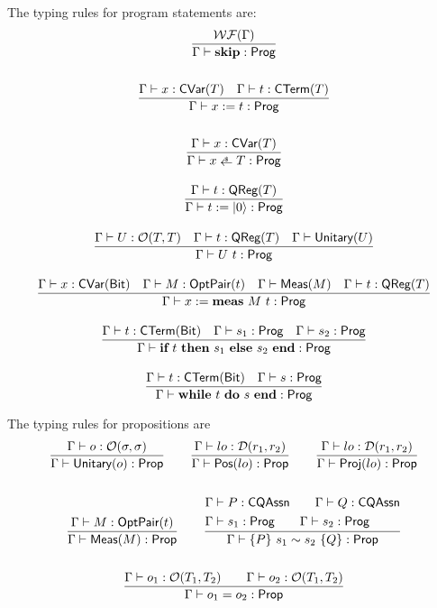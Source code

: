 The typing rules for program statements are:
\begin{gather*}
    \frac{\WF{\Gamma}}{\Gamma \vdash \Skip : \prog} \\
    \\
    \frac{\Gamma \vdash x : \cvar{T} \quad \Gamma \vdash t : \CTerm{T}}{\Gamma \vdash \Assign{x}{t} : \prog} \\
    \\
    \frac{\Gamma \vdash x : \cvar{T}}{\Gamma \vdash \pAssign{x}{T} : \prog} \\
    \\
    \frac{\Gamma \vdash t : \qreg{T}}{\Gamma \vdash \Init{t} : \prog} \\
    \\
    \frac{\Gamma \vdash U : \opt{T}{T} \quad \Gamma \vdash t : \qreg{T} \quad \Gamma \vdash \unitary{U}}{\Gamma \vdash U\ t : \prog} \\
    \\
    \frac{\Gamma \vdash x : \cvar{\bit} \quad \Gamma \vdash M : \optpair{t} \quad \Gamma \vdash \meas{M} \quad \Gamma \vdash t : \qreg{T} }{\Gamma \vdash \MeaAssign{x}{M}{t} : \prog} \\
    \\
    \frac{\Gamma \vdash t : \CTerm{\bit} \quad \Gamma \vdash s_1 : \prog \quad \Gamma \vdash s_2 : \prog}
    {\Gamma \vdash \If{t}{s_1}{s_2} : \prog} \\
    \\
    \frac{\Gamma \vdash t : \CTerm{\bit} \quad \Gamma \vdash s : \prog}
    {\Gamma \vdash \While{t}{s} : \prog}
\end{gather*}



The typing rules for propositions are
\begin{gather*}
    \frac{\Gamma \vdash o : \mathcal{O}(\sigma, \sigma)}{\Gamma \vdash \textsf{Unitary}({o}) : \textsf{Prop}}
    \qquad
    \frac{\Gamma \vdash lo : \mathcal{D}(r_1, r_2)}{\Gamma \vdash \textsf{Pos}({lo}) : \textsf{Prop}} 
    \qquad
    \frac{\Gamma \vdash lo : \mathcal{D}(r_1, r_2)}{\Gamma \vdash \textsf{Proj}({lo}) : \textsf{Prop}} \\
    \\
    \frac{\Gamma \vdash M : \textsf{OptPair}(t)}{\Gamma \vdash \textsf{Meas}(M) : \textsf{Prop}}
    \qquad
    \frac{
        \begin{aligned}
            & \Gamma \vdash P : \textsf{CQAssn} \qquad \Gamma \vdash Q : \textsf{CQAssn} \\
            & \Gamma \vdash s_1 : \textsf{Prog} \qquad \Gamma \vdash s_2 : \textsf{Prog}
        \end{aligned}}
        {
            \Gamma \vdash \{P\}~s_1 \sim s_2~\{Q\} : \textsf{Prop}
        } \\
    \\
    \frac{\Gamma \vdash o_1 : \mathcal{O}(T_1, T_2) \qquad \Gamma \vdash o_2 : \mathcal{O}(T_1, T_2)}{\Gamma \vdash o_1 = o_2 : \textsf{Prop}}
\end{gather*}



